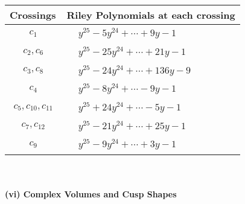 \documentclass[1p]{elsarticle_modified}
\theoremstyle{definition}
\begin{document}
\begin{tabular}{m{50pt}|m{274pt}}
Crossings & \hspace{64pt}Riley Polynomials at each crossing \\
\hline $$\begin{aligned}c_{1}\end{aligned}$$&$\begin{aligned}
&y^{25}-5 y^{24}+\cdots+9 y-1
\end{aligned}$\\
\hline $$\begin{aligned}c_{2},c_{6}\end{aligned}$$&$\begin{aligned}
&y^{25}-25 y^{24}+\cdots+21 y-1
\end{aligned}$\\
\hline $$\begin{aligned}c_{3},c_{8}\end{aligned}$$&$\begin{aligned}
&y^{25}-24 y^{24}+\cdots+136 y-9
\end{aligned}$\\
\hline $$\begin{aligned}c_{4}\end{aligned}$$&$\begin{aligned}
&y^{25}-8 y^{24}+\cdots-9 y-1
\end{aligned}$\\
\hline $$\begin{aligned}c_{5},c_{10},c_{11}\end{aligned}$$&$\begin{aligned}
&y^{25}+24 y^{24}+\cdots-5 y-1
\end{aligned}$\\
\hline $$\begin{aligned}c_{7},c_{12}\end{aligned}$$&$\begin{aligned}
&y^{25}-21 y^{24}+\cdots+25 y-1
\end{aligned}$\\
\hline $$\begin{aligned}c_{9}\end{aligned}$$&$\begin{aligned}
&y^{25}-9 y^{24}+\cdots+3 y-1
\end{aligned}$\\
\hline
\end{tabular}\\~\\
\newpage\flushleft \textbf{(vi) Complex Volumes and Cusp Shapes}
\end{document}
